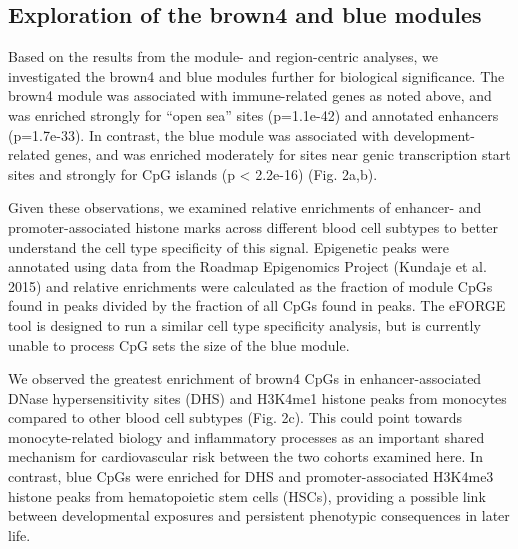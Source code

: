 \documentclass[]{article}
\theoremstyle{definition}
\theoremstyle{definition}
\theoremstyle{definition}
\theoremstyle{remark}
\begin{document}
\subsection{Exploration of the brown4 and blue
modules}\label{exploration-of-the-brown4-and-blue-modules}

Based on the results from the module- and region-centric analyses, we
investigated the brown4 and blue modules further for biological
significance. The brown4 module was associated with immune-related genes
as noted above, and was enriched strongly for ``open sea'' sites
(p=1.1e-42) and annotated enhancers (p=1.7e-33). In contrast, the blue
module was associated with development-related genes, and was enriched
moderately for sites near genic transcription start sites and strongly
for CpG islands (p \textless{} 2.2e-16) (Fig. 2a,b).

Given these observations, we examined relative enrichments of enhancer-
and promoter-associated histone marks across different blood cell
subtypes to better understand the cell type specificity of this signal.
Epigenetic peaks were annotated using data from the Roadmap Epigenomics
Project (Kundaje et al. 2015) and relative enrichments were calculated
as the fraction of module CpGs found in peaks divided by the fraction of
all CpGs found in peaks. The eFORGE tool is designed to run a similar
cell type specificity analysis, but is currently unable to process CpG
sets the size of the blue module.

We observed the greatest enrichment of brown4 CpGs in
enhancer-associated DNase hypersensitivity sites (DHS) and H3K4me1
histone peaks from monocytes compared to other blood cell subtypes (Fig.
2c). This could point towards monocyte-related biology and inflammatory
processes as an important shared mechanism for cardiovascular risk
between the two cohorts examined here. In contrast, blue CpGs were
enriched for DHS and promoter-associated H3K4me3 histone peaks from
hematopoietic stem cells (HSCs), providing a possible link between
developmental exposures and persistent phenotypic consequences in later
life.
\end{document}

